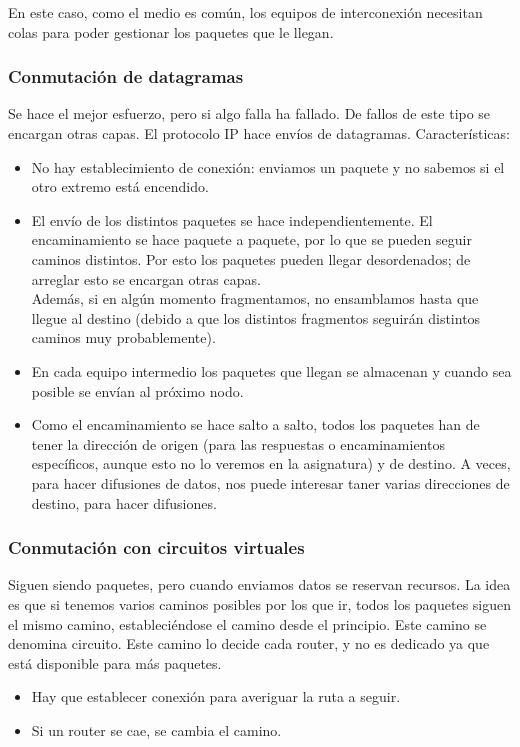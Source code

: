 En este caso, como el medio es común, los equipos de interconexión necesitan colas para poder gestionar los paquetes que le llegan. 

\subsubsection{Conmutación de datagramas}
Se hace el mejor esfuerzo, pero si algo falla ha fallado.  De fallos de este tipo se encargan otras capas. El protocolo IP hace envíos de datagramas.
Características:
\begin{itemize}
    \item No hay establecimiento de conexión: enviamos un paquete y no sabemos si el otro extremo está encendido.
    \item El envío de los distintos paquetes se hace independientemente. El encaminamiento se hace paquete a paquete, por lo que se pueden seguir caminos distintos. Por esto los paquetes pueden llegar desordenados; de arreglar esto se encargan otras capas. \\
        Además, si en algún momento fragmentamos, no ensamblamos hasta que llegue al destino (debido a que los distintos fragmentos seguirán distintos caminos muy probablemente).  
    \item En cada equipo intermedio los paquetes que llegan se almacenan y cuando sea posible se envían al próximo nodo. 
    \item Como el encaminamiento se hace salto a salto, todos los paquetes han de tener la dirección de origen (para las respuestas o encaminamientos específicos, aunque esto no lo veremos en la asignatura) y de destino. A veces, para hacer difusiones de datos, nos puede interesar taner varias direcciones de destino, para hacer difusiones.
\end{itemize}

\subsubsection{Conmutación con circuitos virtuales} 

Siguen siendo paquetes, pero cuando enviamos datos se reservan recursos. 
La idea es que si tenemos varios caminos posibles por los que ir, todos los paquetes siguen el mismo camino, estableciéndose el camino desde el principio. Este camino se denomina circuito. Este camino lo decide cada router, y no es dedicado ya que está disponible para más paquetes. 

\begin{itemize}
    \item Hay que establecer conexión para averiguar la ruta a seguir. 
    \item Si un router se cae, se cambia el camino. 
\end{itemize}


